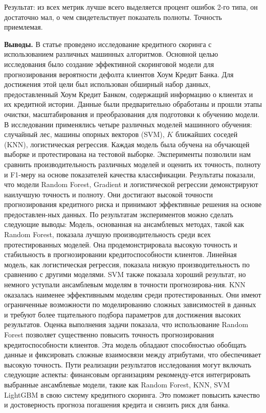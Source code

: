 \begin{multicols}{2}
Результат: из всех метрик лучше всего выделяется процент ошибок 2-го
типа, он достаточно мал, о чем свидетельствует показатель полноты.
Точность приемлемая.

{\bfseries Выводы.} В статье проведено исследование кредитного скоринга с
использованием различных машинных алгоритмов. Основной целью
исследования было создание эффективной скоринговой модели для
прогнозирования вероятности дефолта клиентов Хоум Кредит Банка. Для
достижения этой цели был использован обширный набор данных,
предоставленный Хоум Кредит Банком, содержащий информацию о клиентах и
\hspace{0pt}\hspace{0pt}их кредитной истории. Данные были предварительно
обработаны и прошли этапы очистки, масштабирования и преобразования для
подготовки к обучению модели. В исследовании применялись четыре
различных моделей машинного обучения: случайный лес, машины опорных
векторов (SVM), $K$ ближайших соседей
(KNN), логистическая регрессия. Каждая модель была обучена на обучающей
выборке и протестирована на тестовой выборке. Эксперименты позволили нам
сравнить производительность различных моделей и оценить их точность,
полноту и F1-меру на основе показателей качества классификации.
Результаты показали, что модели Random Forest, Gradient и логистической
регрессии демонстрируют наилучшую точность и полноту. Они достигают
высокой точности прогнозирования кредитного риска и принимают
эффективные решения на основе предоставлен-ных данных. По результатам
экспериментов можно сделать следующие выводы: Модель, основанная на
ансамблевых методах, такой как Random Forest, показала лучшую
производительность среди всех протестированных моделей. Она
продемонстрировала высокую точность и стабильность в прогнозировании
кредитоспособности клиентов. Линейная модель, как логистическая
регрессия, показала низкую производительность по сравнению с другими
моделями. SVM также показала хороший результат, но немного уступали
ансамблевым моделям в точности прогнозирова-ния. KNN оказалась наименее
эффективнымм моделям среди протестированных. Они имеют ограниченные
возможности по моделированию сложных зависимостей в данных и требуют
более тщательного подбора параметров для достижения высоких результатов.
Оценка выполнения задачи показала, что использование Random Forest
позволяет существенно повысить точность прогнозирования
кредитоспособности клиентов. Эта модель обладают способностью обобщать
данные и фиксировать сложные взаимосвязи между атрибутами, что
обеспечивает высокую точность. Пути реализации результатов исследования
могут включать следующие аспекты: финансовым организациям рекоменду-ется
интегрировать выбранные ансамблевые модели, такие как Random Forest,
KNN, SVM LightGBM в свою систему кредитного скоринга. Это поможет
повысить качество и достоверность прогноза погашения кредита и снизить
риск для банка.

\end{multicols}

